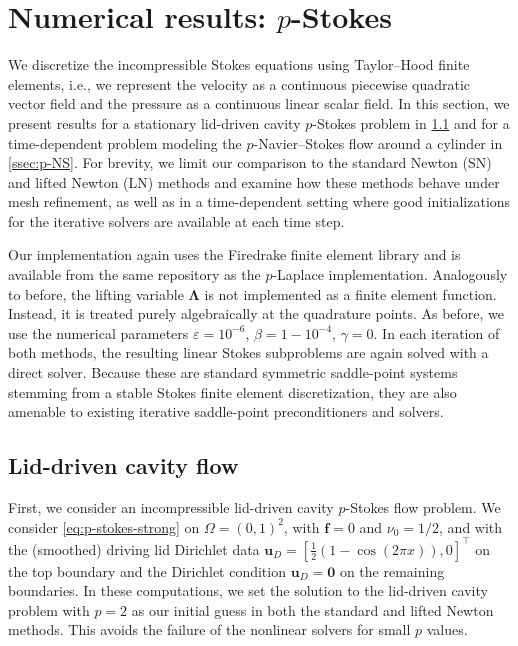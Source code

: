 \documentclass[11pt,pdflatex,sn-mathphys-num]{sn-jnl}
\theoremstyle{thmstyleone}%
\theoremstyle{thmstyletwo}%
\theoremstyle{thmstylethree}%
\newcommand{\bs}[1]{\ensuremath{\boldsymbol{#1}}}
\begin{document}
\section{Numerical results: $p$-Stokes}\label{sec:p-Stokes-numerics}

We discretize the incompressible Stokes equations using Taylor--Hood finite elements, i.e., we represent the velocity as a continuous piecewise quadratic vector field and the pressure as a continuous linear scalar field.
In this section, we present results for a stationary lid-driven cavity $p$-Stokes problem in \cref{ssec:lid-driven} and for %
a time-dependent problem modeling the $p$-Navier--Stokes flow around a cylinder in \cref{ssec:p-NS}. For brevity, we limit our comparison to the standard Newton (SN) and lifted Newton (LN) methods and examine how these methods behave under mesh refinement, as well as in a time-dependent setting where good initializations for the iterative solvers are available at each time step.

Our implementation again uses the Firedrake finite element library and is available from the same repository as the $p$-Laplace implementation. Analogously to before, the lifting variable $\bs\Lambda$ is not implemented as a finite element function. Instead, it is treated purely algebraically at the quadrature points. As before, we use the numerical parameters $\varepsilon=10^{-6}$, $\beta=1-10^{-4}$, $\gamma=0$. 
In each iteration of both methods, the resulting linear Stokes subproblems are again solved with a direct solver. Because these are standard symmetric saddle-point systems stemming from a stable Stokes finite element discretization, they are also amenable to existing iterative saddle-point preconditioners and solvers.


\subsection{Lid-driven cavity flow}\label{ssec:lid-driven}
First, we consider an incompressible lid-driven cavity $p$-Stokes flow problem. We consider \eqref{eq:p-stokes-strong} on $\Omega = (0,1)^2$, with $\bs f=0$ and $\nu_0=1/2$, and with the (smoothed) driving lid Dirichlet data $\bs{u}_D = [\frac{1}{2}(1 - \cos(2\pi x)), 0]^\top$ on the top boundary and the Dirichlet condition $\bs{u}_D = \bs{0}$ on the remaining boundaries. In these computations, we set the solution to the lid-driven cavity problem with $p=2$ as our initial guess in both the standard and lifted Newton methods. This avoids the failure of the nonlinear solvers for small $p$ values.
\end{document}
